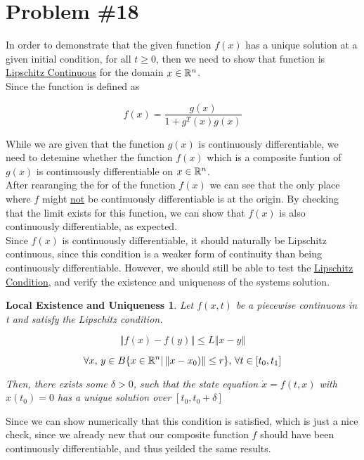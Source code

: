 \section*{Problem \#18}

In order to demonstrate that the given function $f(x)$ has a unique solution at a given initial condition, for all $t\geq 0$, then we need to show that function is \underline{Lipschitz Continuous} for the domain $x\in \mathbb{R}^n$.  \\

\noindent Since the function is defined as

$$
f(x) = \frac{g(x)}{1 + g^T(x)g(x)}
$$

\noindent While we are given that the function $g(x)$ is continuously differentiable, we need to detemine whether the function $f(x)$ which is a composite funtion of $g(x)$ is continuously differentiable on $x\in\mathbb{R}^n$. \\

\noindent After rearanging the for of the function $f(x)$ we can see that the only place where $f$ might \underline{not} be continuously differentiable is at the origin. By checking that the limit exists for this function, we can show that $f(x)$ is also continuously differentiable, as expected. \\

\noindent Since $f(x)$ is continuously differentiable, it should naturally be Lipschitz continuous, since this condition is a weaker form of continuity than being continuously differentiable.  However, we should still be able to test the \underline{Lipschitz Condition}, and verify the existence and uniqueness of the systems solution.

\newtheorem{theorem}{Local Existence and Uniqueness}

\begin{theorem}
Let $f(x,t)$ be a piecewise continuous in t and satisfy the Lipschitz condition.

$$ \left\Vert f(x) - f(y) \right\Vert \leq L \left\Vert x - y \right\Vert$$

$$\forall x\text{, } y \in B \{ x\in \mathbb{R}^n | \left\Vert x- x_0) \right\Vert \leq r \}\text{, }\forall t \in [t_0, t_1]$$

\noindent Then, there exists some $\delta > 0$, such that the state equation $\dot{x}=f(t,x)$ with $x(t_0) =0$ has a unique solution over $[t_0, t_0 + \delta]$ \\
\end{theorem}

\noindent Since we can show numerically that this condition is satisfied, which is just a nice check, since we already new that our composite function $f$ should have been continuously differentiable, and thus yeilded the same results. 
